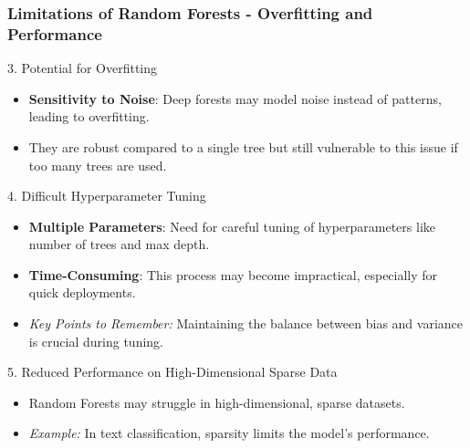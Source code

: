 \documentclass[aspectratio=169]{beamer}
\begin{document}
\begin{frame}[fragile]
  \frametitle{Limitations of Random Forests - Overfitting and Performance}
  \begin{block}{3. Potential for Overfitting}
    \begin{itemize}
      \item \textbf{Sensitivity to Noise}: Deep forests may model noise instead of patterns, leading to overfitting.
      \item They are robust compared to a single tree but still vulnerable to this issue if too many trees are used.
    \end{itemize}
  \end{block}
  
  \begin{block}{4. Difficult Hyperparameter Tuning}
    \begin{itemize}
      \item \textbf{Multiple Parameters}: Need for careful tuning of hyperparameters like number of trees and max depth.
      \item \textbf{Time-Consuming}: This process may become impractical, especially for quick deployments.
      \item \textit{Key Points to Remember:} Maintaining the balance between bias and variance is crucial during tuning.
    \end{itemize}
  \end{block}
  
  \begin{block}{5. Reduced Performance on High-Dimensional Sparse Data}
    \begin{itemize}
      \item Random Forests may struggle in high-dimensional, sparse datasets.
      \item \textit{Example:} In text classification, sparsity limits the model's performance.
    \end{itemize}
  \end{block}
\end{frame}
\end{document}
